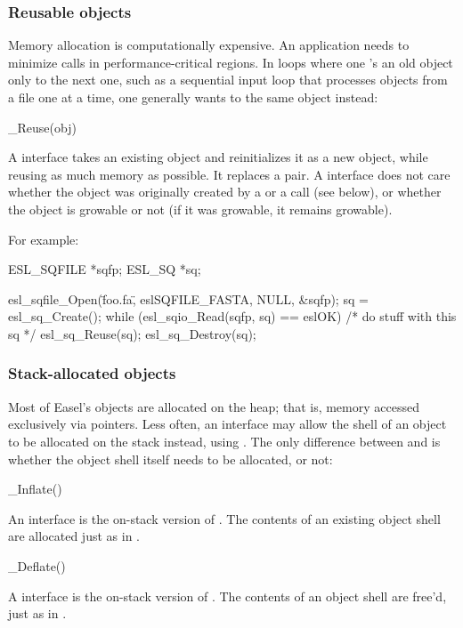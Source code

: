   \subsubsection{Reusable objects}

Memory allocation is computationally expensive. An application needs
to minimize  calls in performance-critical
regions. In loops where one 's an old object only
to  the next one, such as a sequential input loop
that processes objects from a file one at a time, one generally wants
to  the same object instead:

\begin{sreapi}
\hypertarget{ifc:Reuse}
{\item[\_Reuse(obj)]}

A  interface takes an existing object and
reinitializes it as a new object, while reusing as much memory as
possible. It replaces a  pair. A
 interface does not care whether the object was
originally created by a  or a 
call (see below), or whether the object is growable or not (if it was
growable, it remains growable).
\end{sreapi}

For example:

\begin{cchunk}
   ESL_SQFILE *sqfp;
   ESL_SQ     *sq;

   esl_sqfile_Open(\"foo.fa\", eslSQFILE_FASTA, NULL, &sqfp);
   sq = esl_sq_Create();
   while (esl_sqio_Read(sqfp, sq) == eslOK)
    {
       /* do stuff with this sq */
       esl_sq_Reuse(sq);
    }
   esl_sq_Destroy(sq);
\end{cchunk}


  \subsubsection{Stack-allocated objects}

Most of Easel's objects are allocated on the heap; that is,
 memory accessed exclusively via pointers. Less
often, an interface may allow the shell of an object to be allocated
on the stack instead, using .  The only
difference between  and
 is whether the object shell itself
needs to be allocated, or not:

\begin{sreapi}
\hypertarget{ifc:Inflate}
{\item[\_Inflate()]}

An  interface is the on-stack version of
. The contents of an existing object shell
are allocated just as in .

\hypertarget{ifc:Deflate}
{\item[\_Deflate()]}

A  interface is the on-stack version of
. The contents of an object shell are free'd,
just as in .
\end{sreapi}

